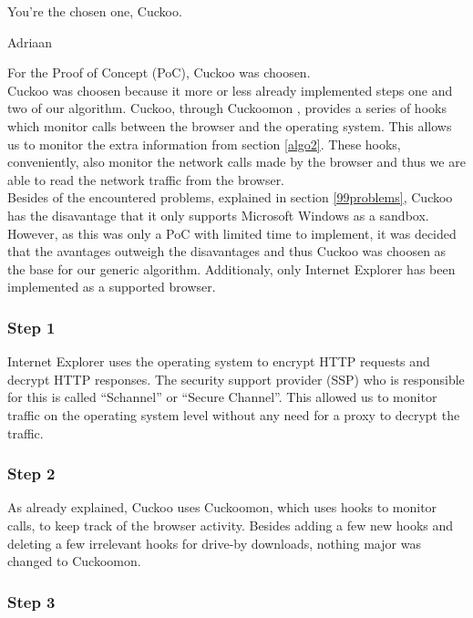 \epigraph{You're the chosen one, Cuckoo.}{Adriaan}

For the Proof of Concept (PoC), Cuckoo \cite{cuckoo} was choosen. \\

Cuckoo was choosen because it more or less already implemented steps one and two of our algorithm. Cuckoo, through Cuckoomon \cite{cuckoomon}, provides a series of hooks which monitor calls between the browser and the operating system. This allows us to monitor the extra information from section \ref{algo2}. These hooks, conveniently, also monitor the network calls made by the browser and thus we are able to read the network traffic from the browser.\\

Besides of the encountered problems, explained in section \ref{99problems}, Cuckoo has the disavantage that it only supports Microsoft Windows as a sandbox. However, as this was only a PoC with limited time to implement, it was decided that the avantages outweigh the disavantages and thus Cuckoo was choosen as the base for our generic algorithm. Additionaly, only Internet Explorer has been implemented as a supported browser.

\subsubsection{Step 1}

Internet Explorer uses the operating system to encrypt HTTP requests and decrypt HTTP responses. The security support provider (SSP) who is responsible for this is called ``Schannel'' or ``Secure Channel''\cite{schannel}. This allowed us to monitor traffic on the operating system level without any need for a proxy to decrypt the traffic.

\subsubsection{Step 2}

As already explained, Cuckoo uses Cuckoomon, which uses hooks to monitor calls, to keep track of the browser activity. Besides adding a few new hooks and deleting a few irrelevant hooks for drive-by downloads, nothing major was changed to Cuckoomon.

\subsubsection{Step 3}

